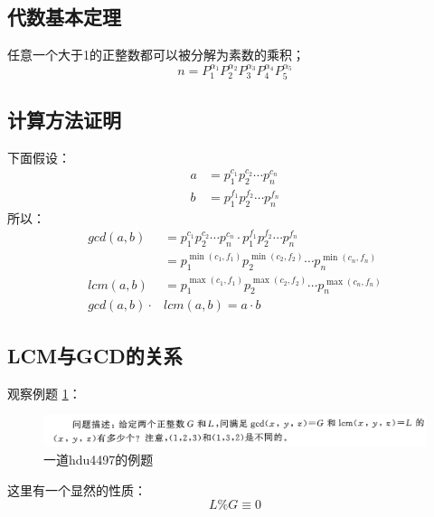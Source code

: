 \documentclass[12pt]{article}
\begin{document}
\subsection{代数基本定理}
任意一个大于1的正整数都可以被分解为素数的乘积；
\begin{displaymath}
    n=P_{1}^{\alpha_{1}} P_{2}^{\alpha_{2}} P_{3}^{\alpha_{3}} P_{4}^{\alpha_{4}} P_{5}^{\alpha_{5}}
\end{displaymath}

\subsection{计算方法证明}
下面假设：
\begin{align}
    a&=p_{1}^{c_{1}} p_{2}^{c_{2}} \cdots p_{n}^{c_{n}}\\
    b&=p_{1}^{f_{1}} p_{2}^{f_{2}} \cdots p_{n}^{f_{n}}
\end{align}
所以：
\begin{align}
    gcd(a,b) &= p_{1}^{c_{1}} p_{2}^{c_{2}} \cdots p_{n}^{c_{n}} \cdot p_{1}^{f_{1}} p_{2}^{f_{2}} \cdots p_{n}^{f_{n}} \\
    &=p_{1}^{\min (c_{1},f_{1})} p_{2}^{\min (c_{2},f_{2})} \cdots p_{n}^{\min (c_{n},f_{n})}\\
    lcm(a,b) &= p_{1}^{\max (c_{1},f_{1})} p_{2}^{\max (c_{2},f_{2})} \cdots p_{n}^{\max (c_{n},f_{n})}\\
    gcd(a,b)\cdot &lcm(a,b) = a\cdot b
\end{align}


\subsection{LCM与GCD的关系}

观察例题 \ref{fig.lcm-gcd-relation}：

\begin{figure}[!htb]
    \centering
    \includegraphics[width=\textwidth]{./images/hdu4497}
    \caption{一道hdu4497的例题}
    \label{fig.lcm-gcd-relation}
\end{figure}

这里有一个显然的性质：
\begin{displaymath}
    L \% G \equiv 0
\end{displaymath}
\end{document}
